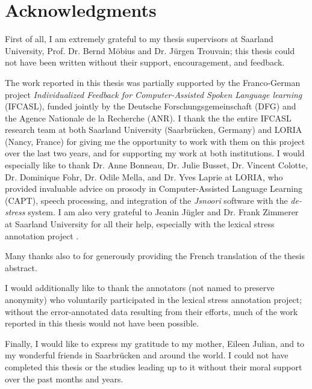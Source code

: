 %
\chapter*{Acknowledgments}
\label{sec:thanks}
\vspace*{-10mm}


First of all, I am extremely grateful to my thesis supervisors at Saarland University, Prof. Dr. Bernd Möbius and Dr. Jürgen Trouvain; this thesis could not have been written without their support, encouragement, and feedback.

The work reported in this thesis was partially supported by the Franco-German project \textit{Individualized Feedback for Computer-Assisted Spoken Language learning} (IFCASL), funded jointly by the Deutsche Forschungsgemeinschaft (DFG) and the Agence Nationale de la Recherche (ANR). I thank the the entire IFCASL research team at both Saarland University (Saarbrücken, Germany) and LORIA (Nancy, France) for giving me the opportunity to work with them on this project over the last two years, and for supporting my work at both institutions.
%
I would especially like to thank Dr. Anne Bonneau, Dr. Julie Busset, Dr. Vincent Colotte, Dr. Dominique Fohr, Dr. Odile Mella, and Dr. Yves Laprie at LORIA, who provided invaluable advice on prosody in Computer-Assisted Language Learning (CAPT), speech processing, and integration of the \textit{Jsnoori} software with the \textit{de-stress} system. I am also very grateful to Jeanin Jügler and Dr. Frank Zimmerer at Saarland University for all their help, especially with the lexical stress annotation project . 

Many thanks also to  for generously providing the French translation of the thesis abstract.

I would additionally like to thank the annotators (not named to preserve anonymity) who voluntarily participated in the lexical stress annotation project; without the error-annotated data resulting from their efforts, much of the work reported in this thesis would not have been possible.

Finally, I would like to express my gratitude to 
my mother, Eileen Julian, and to my wonderful friends in Saarbrücken and around the world.
I could not have completed this thesis or the studies leading up to it without 
their moral support over the past months and years.